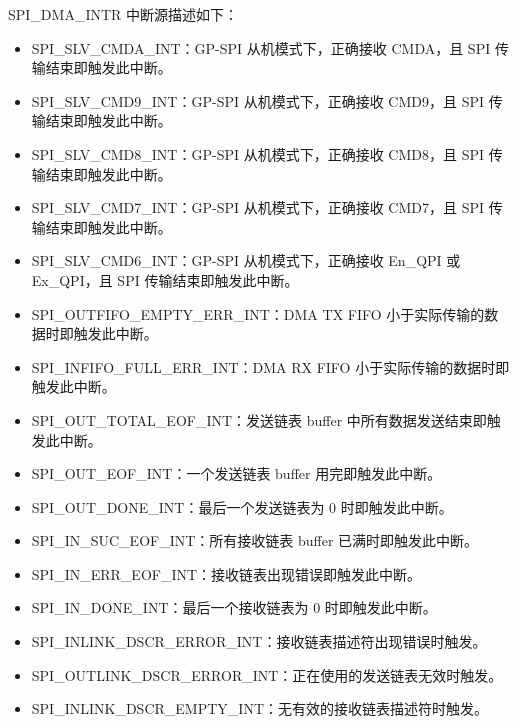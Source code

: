 \documentclass[main\_\_CN.tex]{subfiles}
\begin{document}
SPI\_DMA\_INTR 中断源描述如下：
\begin{itemize}
\item \label{int:SPISLVCMDAINT} SPI\_SLV\_CMDA\_INT：GP-SPI 从机模式下，正确接收 CMDA，且 SPI 传输结束即触发此中断。

\item \label{int:SPISLVCMD9INT} SPI\_SLV\_CMD9\_INT：GP-SPI 从机模式下，正确接收 CMD9，且 SPI 传输结束即触发此中断。

\item \label{int:SPISLVCMD8INT} SPI\_SLV\_CMD8\_INT：GP-SPI 从机模式下，正确接收 CMD8，且 SPI 传输结束即触发此中断。

\item \label{int:SPISLVCMD7INT} SPI\_SLV\_CMD7\_INT：GP-SPI 从机模式下，正确接收 CMD7，且 SPI 传输结束即触发此中断。

\item \label{int:SPISLVCMD6INT} SPI\_SLV\_CMD6\_INT：GP-SPI 从机模式下，正确接收 En\_QPI 或 Ex\_QPI，且 SPI 传输结束即触发此中断。

\item \label{int:SPIOUTFIFOEMPTYERRINT}SPI\_OUTFIFO\_EMPTY\_ERR\_INT：DMA TX FIFO 小于实际传输的数据时即触发此中断。
\item \label{int:SPIINFIFOFULLERRINT}SPI\_INFIFO\_FULL\_ERR\_INT：DMA RX FIFO 小于实际传输的数据时即触发此中断。
\item \label{int:SPIOUTTOTALEOFINT}SPI\_OUT\_TOTAL\_EOF\_INT：发送链表 buffer 中所有数据发送结束即触发此中断。
\item \label{int:SPIOUTEOFINT}SPI\_OUT\_EOF\_INT：一个发送链表 buffer 用完即触发此中断。
\item \label{int:SPIOUTDONEINT}SPI\_OUT\_DONE\_INT：最后一个发送链表为 0 时即触发此中断。
\item \label{int:SPIINSUCEOFINT}SPI\_IN\_SUC\_EOF\_INT：所有接收链表 buffer 已满时即触发此中断。
\item \label{int:SPIINERREOFINT}SPI\_IN\_ERR\_EOF\_INT：接收链表出现错误即触发此中断。
\item \label{int:SPIINDONEINT}SPI\_IN\_DONE\_INT：最后一个接收链表为 0 时即触发此中断。
\item \label{int:SPIINLINKDSCRERRORINT}SPI\_INLINK\_DSCR\_ERROR\_INT：接收链表描述符出现错误时触发。
\item \label{int:SPIOUTLINKDSCRERRORINT}SPI\_OUTLINK\_DSCR\_ERROR\_INT：正在使用的发送链表无效时触发。
\item \label{int:SPIINLINKDSCREMPTYINT}SPI\_INLINK\_DSCR\_EMPTY\_INT：无有效的接收链表描述符时触发。
\end{itemize}
\end{document}
